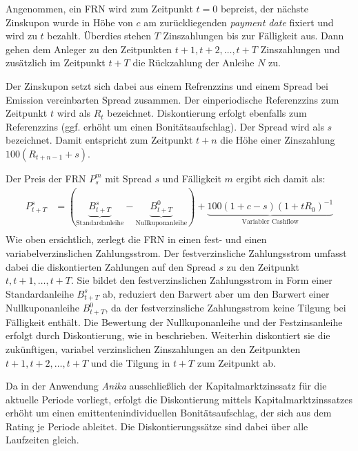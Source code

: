 \documentclass[12pt, a4paper]{article}
\theoremstyle{plain}
\begin{document}
Angenommen, ein \gls{FRN} wird zum Zeitpunkt $t = 0$ bepreist, der nächste Zinskupon wurde in Höhe von $c$ am zurückliegenden \textit{payment date} fixiert und wird zu $t$ bezahlt. Überdies stehen $T$ Zinszahlungen bis zur Fälligkeit aus. Dann gehen dem Anleger zu den Zeitpunkten $t+1, t+2, \ldots, t+T$ Zinszahlungen und zusätzlich im Zeitpunkt $t+T$ die Rückzahlung der Anleihe $N$ zu.

Der Zinskupon setzt sich dabei aus einem Refrenzzins und einem Spread bei Emission vereinbarten Spread zusammen. Der einperiodische Referenzzins zum Zeitpunkt $t$ wird als $R_t$ bezeichnet. Diskontierung erfolgt ebenfalls zum Referenzzins (ggf. erhöht um einen Bonitätsaufschlag). Der Spread wird als $s$ bezeichnet. Damit entspricht zum Zeitpunkt $t+n$ die Höhe einer Zinszahlung $100(R_{t+n-1}+s)$. 

Der Preis der \gls{FRN} $P_{s}^{m}$ mit Spread $s$ und Fälligkeit $m$ ergibt sich damit als:
\begin{align*}
	P_{t+T}^{s}&=(\underbrace{B_{t+T}^{s}}_\text{Standardanleihe}-\underbrace{B_{t+T}^{0}}_\text{Nullkuponanleihe})+\underbrace{100(1+c - s)(1+t R_{0})^{-1}}_\text{Variabler Cashflow}\\
\end{align*}
Wie oben ersichtlich, zerlegt \textcite[][31]{alexander_market_2008} die \gls{FRN} in einen fest- und einen variabelverzinslichen Zahlungsstrom. Der festverzinsliche Zahlungsstrom umfasst dabei die diskontierten Zahlungen auf den Spread $s$ zu den Zeitpunkt $t, t+1, \ldots, t+T$. Sie bildet den festverzinslichen Zahlungsstrom in Form einer Standardanleihe $B_{t+T}^{s}$ ab, reduziert den Barwert aber um den Barwert einer Nullkuponanleihe $B_{t+T}^{0}$, da der festverzinsliche Zahlungsstrom keine Tilgung bei Fälligkeit enthält. Die Bewertung der Nullkuponanleihe und der Festzinsanleihe erfolgt durch Diskontierung, wie in \textcite[][11]{alexander_market_2008} beschrieben. Weiterhin diskontiert sie die zukünftigen, variabel verzinslichen Zinszahlungen an den Zeitpunkten $t+1, t+2, \ldots, t+T$ und die Tilgung in $t+T$  zum Zeitpunkt ab. 

Da in der Anwendung \textit{Anika} ausschließlich der Kapitalmarktzinssatz für die aktuelle Periode vorliegt, erfolgt die Diskontierung mittels Kapitalmarktzinssatzes erhöht um einen emittentenindividuellen Bonitätsaufschlag, der sich aus dem Rating je Periode ableitet. Die Diskontierungssätze sind dabei über alle Laufzeiten gleich.
\end{document}
